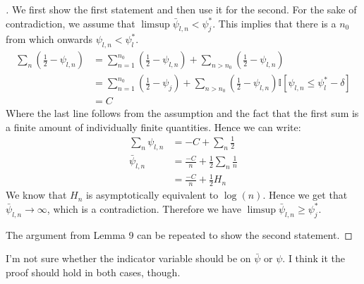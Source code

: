 \begin{proof}[]
    We first show the first statement and then use it for the second.
    For the sake of contradiction, we assume that $\limsup \bar{\psi}_{l, n} < \psi_j^*$. This implies that there is a $n_0$ from which onwards $\psi_{l, n} < \psi_l^*$.
    \begin{align}
      \sum_n (\frac{1}{2} - \psi_{l, n}) &= \sum_{n=1}^{n_0} (\frac{1}{2} - \psi_{l, n}) + \sum_{n > n_0} (\frac{1}{2} - \psi_{l, n}) \\
        &= \sum_{n=1}^{n_0} (\frac{1}{2} - \psi_j) + \sum_{n > n_0} (\frac{1}{2} - \psi_{l, n})\mathbb{I}[\psi_{l, n} \leq \psi_l^* - \delta] \\
        &= C
    \end{align}
    Where the last line follows from the assumption and the fact that the first sum is a finite amount of individually finite quantities.
    Hence we can write:
    \begin{align}
      \sum_n \psi_{l, n} &= -C + \sum_n \frac{1}{2} \\
      \bar{\psi}_{l, n} &= \frac{-C}{n} + \frac{1}{2}\sum_n\frac{1}{n} \\
        &= \frac{-C}{n} + \frac{1}{2} H_n
    \end{align}
    We know that $H_n$ is asymptotically equivalent to $\log(n)$. Hence we get that $\bar{\psi}_{l, n} \rightarrow \infty$, which is a contradiction. Therefore we have $\limsup \bar{\psi}_{l, n} \geq \psi_j^*$.

    The argument from Lemma 9 can be repeated to show the second statement.
  \end{proof}

  \begin{remark}[Kevin 19/10/29]
    I'm not sure whether the indicator variable should be on $\bar{\psi}$ or $\psi$. I think it the proof should hold in both cases, though.
  \end{remark}

